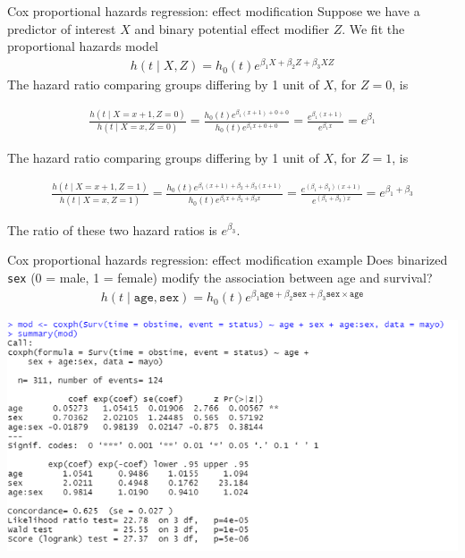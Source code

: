 \documentclass[10pt,t]{beamer}
\begin{document}
\begin{frame}{Cox proportional hazards regression: effect modification}
	Suppose we have a predictor of interest $X$ and binary potential effect modifier $Z$. We fit the proportional hazards model
	\begin{align*}
		h(t \mid X, Z) = h_0(t)e^{\beta_1X + \beta_2Z + \beta_3XZ}
	\end{align*}\pause 
	The hazard ratio comparing groups differing by 1 unit of $X$, for $Z = 0$, is
	\begin{small}
	\begin{align*}
		\frac{h(t \mid X = x+ 1, Z = 0)}{h(t \mid X = x, Z = 0)} = \frac{h_0(t)e^{\beta_1 (x + 1) + 0 + 0}}{h_0(t)e^{\beta_1x + 0 + 0}} = \frac{e^{\beta_1(x + 1)}}{e^{\beta_1 x}} = e^{\beta_1}
	\end{align*}
	\end{small}\pause 
	The hazard ratio comparing groups differing by 1 unit of $X$, for $Z = 1$, is
	\begin{small}
	\begin{align*}
		\frac{h(t \mid X = x+ 1, Z = 1)}{h(t \mid X = x, Z = 1)} = \frac{h_0(t)e^{\beta_1 (x + 1) + \beta_2 + \beta_3(x + 1)}}{h_0(t)e^{\beta_1x + \beta_2 + \beta_3x}} = \frac{e^{(\beta_1 + \beta_3)(x + 1) }}{e^{(\beta_1  + \beta_3)x}} = e^{\beta_1 + \beta_3}
	\end{align*}
	\end{small}\pause 
	The ratio of these two hazard ratios is $e^{\beta_3}$. 
\end{frame}

\begin{frame}{Cox proportional hazards regression: effect modification example}
	Does binarized \texttt{sex} (0 = male, 1 = female) modify the association between age and survival?
	\begin{align*}
		h(t \mid \texttt{age}, \texttt{sex}) = h_0(t)e^{\beta_1\texttt{age} + \beta_2\texttt{sex} + \beta_3\texttt{sex}\times\texttt{age}}
	\end{align*}
			\begin{center}
		\includegraphics[width = \textwidth]{figs/interaction.png}
	\end{center} 
\end{frame}
\end{document}
